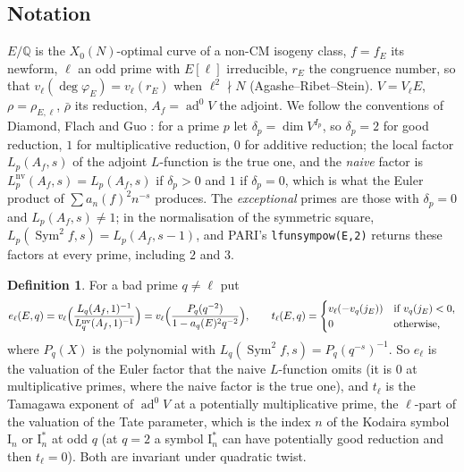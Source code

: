 \documentclass[11pt]{amsart}
\theoremstyle{definition}
\newtheorem{definition}[theorem]{Definition}
\newcommand{\Q}{\mathbb{Q}}\newcommand{\Z}{\mathbb{Z}}\newcommand{\F}{\mathbb{F}}
\newcommand{\degphi}{\deg\varphi_E}\newcommand{\Gal}{\operatorname{Gal}}\newcommand{\ad}{\operatorname{ad}^0}
\newcommand{\Sym}{\operatorname{Sym}^2}\newcommand{\nv}{\mathrm{nv}}\newcommand{\T}{\mathbb{T}}
\begin{document}
\subsection{Notation}
$E/\Q$ is the $X_0(N)$-optimal curve of a non-CM isogeny class, $f=f_E$ its newform, $\ell$ an odd prime with $E[\ell]$ irreducible, $r_E$ the congruence number, so that $v_\ell(\degphi)=v_\ell(r_E)$ when $\ell^2\nmid N$ (Agashe--Ribet--Stein). $V=V_\ell E$, $\rho=\rho_{E,\ell}$, $\bar\rho$ its reduction, $A_f=\ad V$ the adjoint. We follow the conventions of Diamond, Flach and Guo \cite[\S1.7.2]{DFG04}: for a prime $p$ let $\delta_p=\dim V^{I_p}$, so $\delta_p=2$ for good reduction, $1$ for multiplicative reduction, $0$ for additive reduction; the local factor $L_p(A_f,s)$ of the adjoint $L$-function is the true one, and the \emph{naive} factor is $L_p^{\nv}(A_f,s)=L_p(A_f,s)$ if $\delta_p>0$ and $1$ if $\delta_p=0$, which is what the Euler product of $\sum a_n(f)^2n^{-s}$ produces. The \emph{exceptional} primes are those with $\delta_p=0$ and $L_p(A_f,s)\ne1$; in the normalisation of the symmetric square, $L_p(\Sym f,s)=L_p(A_f,s-1)$, and PARI's \texttt{lfunsympow(E,2)} returns these factors at every prime, including $2$ and $3$.

\begin{definition}\label{def:terms}
For a bad prime $q\ne\ell$ put
\[
e_\ell(E,q)=v_\ell\Bigl(\frac{L_q(A_f,1)^{-1}}{L_q^{\nv}(A_f,1)^{-1}}\Bigr)=v_\ell\Bigl(\frac{P_q(q^{-2})}{1-a_q(E)^2q^{-2}}\Bigr),\qquad t_\ell(E,q)=\begin{cases}v_\ell(-v_q(j_E))&\text{if }v_q(j_E)<0,\\0&\text{otherwise,}\end{cases}
\]
where $P_q(X)$ is the polynomial with $L_q(\Sym f,s)=P_q(q^{-s})^{-1}$. So $e_\ell$ is the valuation of the Euler factor that the naive $L$-function omits (it is $0$ at multiplicative primes, where the naive factor is the true one), and $t_\ell$ is the Tamagawa exponent of $\ad V$ at a potentially multiplicative prime, the $\ell$-part of the valuation of the Tate parameter, which is the index $n$ of the Kodaira symbol $\mathrm{I}_n$ or $\mathrm{I}_n^*$ at odd $q$ (at $q=2$ a symbol $\mathrm{I}_n^*$ can have potentially good reduction and then $t_\ell=0$). Both are invariant under quadratic twist.
\end{definition}
\end{document}
